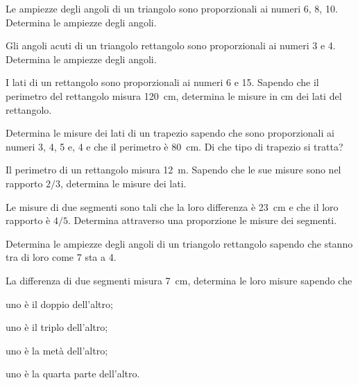 \begin{multicols}{2}
\begin{esercizio}
\label{ese:6.21}
Le ampiezze degli angoli di un triangolo sono proporzionali ai numeri 6, 8, 10. Determina le ampiezze degli angoli.
\end{esercizio}

\begin{esercizio}
\label{ese:6.22}
Gli angoli acuti di un triangolo rettangolo sono proporzionali ai numeri 3 e 4. Determina le ampiezze degli angoli.
\end{esercizio}

\begin{esercizio}
\label{ese:6.23}
I lati di un rettangolo sono proporzionali ai numeri 6 e 15. Sapendo che il perimetro del rettangolo misura 120~cm, determina le misure in cm dei lati del rettangolo.
\end{esercizio}

\begin{esercizio}
\label{ese:6.24}
Determina le misure dei lati di un trapezio sapendo che sono proporzionali ai numeri 3, 4, 5 e, 4 e che il perimetro è 80~cm. Di che tipo di trapezio si tratta?
\end{esercizio}

\begin{esercizio}
\label{ese:6.25}
Il perimetro di un rettangolo misura 12~m. Sapendo che le sue misure sono nel rapporto $2/3$, determina le misure dei lati.
\end{esercizio}

\begin{esercizio}
\label{ese:6.26}
Le misure di due segmenti sono tali che la loro differenza è 23~cm e che il loro rapporto è $4/5$. Determina attraverso una proporzione le misure dei segmenti. 
\end{esercizio}

\begin{esercizio}
\label{ese:6.27}
Determina le ampiezze degli angoli di un triangolo rettangolo sapendo che stanno tra di loro come 7 sta a 4.
\end{esercizio}

\begin{esercizio}
\label{ese:6.28}
La differenza di due segmenti misura 7~cm, determina le loro misure sapendo che
\begin{enumeratea}
\item uno è il doppio dell'altro;
\item uno è il triplo dell'altro;
\item uno è la metà dell'altro;
\item uno è la quarta parte dell'altro.
\end{enumeratea}
\end{esercizio}


\end{multicols}
